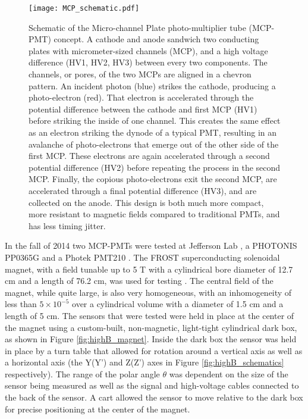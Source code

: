 \begin{figure}[!htb]
	\centering
	\texttt{[image: MCP\_schematic.pdf]}
	\caption{Schematic of the Micro-channel Plate photo-multiplier tube (MCP-PMT) concept. A cathode and anode sandwich two conducting plates with micrometer-sized channels (MCP), and a high voltage difference (HV1, HV2, HV3) between every two components. The channels, or pores, of the two MCPs are aligned in a chevron pattern. An incident photon (blue) strikes the cathode, producing a photo-electron (red). That electron is accelerated through the potential difference between the cathode and first MCP (HV1) before striking the inside of one channel. This creates the same effect as an electron striking the dynode of a typical PMT, resulting in an avalanche of photo-electrons that emerge out of the other side of the first MCP. These electrons are again accelerated through a second potential difference (HV2) before repeating the process in the second MCP. Finally, the copious photo-electrons exit the second MCP, are accelerated through a final potential difference (HV3), and are collected on the anode. This design is both much more compact, more resistant to magnetic fields compared to traditional PMTs, and has less timing jitter. }
	\label{fig:MCP_schematic}
\end{figure}

In the fall of 2014 two MCP-PMTs were tested at Jefferson Lab \cite{HighB_DIRC2015}, a PHOTONIS PP0365G \cite{PHOTONIS} and a Photek PMT210 \cite{Photek}. The FROST  superconducting solenoidal magnet, with a field tunable up to 5 T with a cylindrical bore diameter of 12.7 cm and a length of 76.2 cm, was used for testing \cite{JLab_FrozenTarget}. The central field of the magnet, while quite large, is also very homogeneous, with an inhomogeneity of less than $5\times10^{-5}$ over a cylindrical volume with a diameter of 1.5 cm and a length of 5 cm. The sensors that were tested were held in place at the center of the magnet using a custom-built, non-magnetic, light-tight cylindrical dark box, as shown in Figure \ref{fig:highB_magnet}. Inside the dark box the sensor was held in place by a turn table that allowed for rotation around a vertical axis as well as a horizontal axis (the Y(Y') and Z(Z') axes in Figure \ref{fig:highB_schematics} respectively). The range of the polar angle $\theta$ was dependent on the size of the sensor being measured as well as the signal and high-voltage cables connected to the back of the sensor. A cart allowed the sensor to move relative to the dark box for precise positioning at the center of the magnet.

